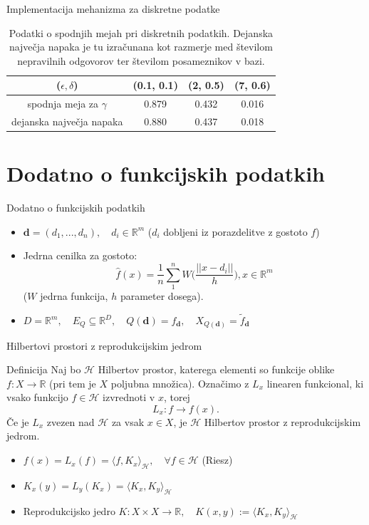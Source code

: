 \documentclass{beamer}
\begin{document}
\begin{frame}{Implementacija mehanizma za diskretne podatke}
\begin{table}[!htb]
\begin{center}
 \begin{tabular}{| c | c | c | c|} 
 \hline
($\epsilon, \delta$) & (0.1, 0.1) & (2, 0.5) & (7, 0.6)  \\ [0.5ex] 
 \hline
 spodnja meja za  $\gamma$ & 0.879 & 0.432 & 0.016  \\ 
 \hline
 dejanska največja napaka & 0.880 & 0.437 & 0.018\\
 \hline
\end{tabular}
\caption{Podatki o spodnjih mejah pri diskretnih podatkih. Dejanska največja napaka je tu izračunana kot razmerje med številom nepravilnih odgovorov ter številom posameznikov v bazi. }
\end{center}
\end{table}
\end{frame}


\section{Dodatno o funkcijskih podatkih}

\begin{frame}{Dodatno o funkcijskih podatkih}
\begin{itemize}
\item $\textbf{d} = (d_1,...,d_n), \quad d_i \in \mathbb{R}^m$ ($d_i$ dobljeni iz porazdelitve z gostoto $f$)
\item Jedrna cenilka za gostoto:
$$
\hat{f}(x)=\frac{1}{n}\sum_{1}^{n}W\Big(\frac{||x-d_i||}{h}\Big), x \in \mathbb{R}^m
$$
($W$ jedrna funkcija, $h$ parameter dosega).
\item $D = \mathbb{R}^m, \quad E_Q \subseteq \mathbb{R}^D, \quad Q(\textbf{d}) = f_{\textbf{d}}, \quad X_{Q({\textbf{d}})} = \tilde{f}_{\textbf{d}}$
\end{itemize}
\end{frame}

\begin{frame}{Hilbertovi prostori z reprodukcijskim jedrom}
\begin{block}{Definicija}
Naj bo $\mathcal{H}$ Hilbertov prostor, katerega elementi so funkcije oblike $f: X \rightarrow \mathbb{R}$ (pri tem je $X$ poljubna množica). Označimo z $L_x$ linearen funkcional, ki vsako funkcijo $f \in \mathcal{H}$ izvrednoti v $x$, torej $$L_x : f \rightarrow f(x).$$ Če je $L_x$ zvezen nad $\mathcal{H}$ za vsak $x \in X$, je $\mathcal{H}$ Hilbertov prostor z reprodukcijskim jedrom.
\end{block}
\begin{itemize}
\item $f(x) = L_x(f) = \langle f, K_x \rangle_{\mathcal{H}}, \quad \forall f \in \mathcal{H}$ (Riesz)
\item $K_x(y) = L_y(K_x) = \langle K_x, K_y \rangle_{\mathcal{H}}$
\item Reprodukcijsko jedro $K: X \times X \rightarrow \mathbb{R}, \quad K(x,y) := \langle K_x, K_y \rangle_{\mathcal{H}}$
\end{itemize}
\end{frame}
\end{document}
